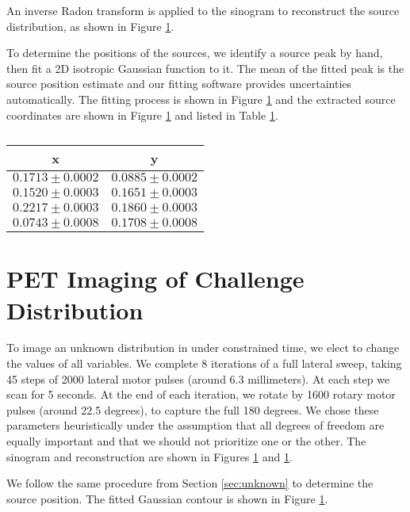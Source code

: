 \documentclass[12pt, letterpaper]{article}
\begin{document}
An inverse Radon transform is applied to the sinogram to reconstruct the source distribution, as shown in Figure \ref{}. 

To determine the positions of the sources, we identify a source peak by hand, then fit a 2D isotropic Gaussian function to it. The mean of the fitted peak is the source position estimate and our fitting software provides uncertainties automatically. The fitting process is shown in Figure \ref{} and the extracted source coordinates are shown in Figure \ref{} and listed in Table \ref{tab:coordinates}. 

\begin{table}
    \centering
    \begin{tabular}{| c | c |}
        \hline
        x & y \\
        \hline
        $0.1713 \pm 0.0002$ & $0.0885 \pm 0.0002$ \\
        $0.1520 \pm 0.0003$ & $0.1651 \pm 0.0003$ \\
        $0.2217 \pm 0.0003$ & $0.1860 \pm 0.0003$ \\
        $0.0743 \pm 0.0008$ & $0.1708 \pm 0.0008$ \\
        \hline
    \end{tabular}
    \caption{}
    \label{tab:coordinates}
\end{table}

\section{PET Imaging of Challenge Distribution}

To image an unknown distribution in under constrained time, we elect to change the values of all variables. We complete 8 iterations of a full lateral sweep, taking 45 steps of 2000 lateral motor pulses (around 6.3 millimeters). At each step we scan for 5 seconds. At the end of each iteration, we rotate by 1600 rotary motor pulses (around 22.5 degrees), to capture the full 180 degrees. We chose these parameters heuristically under the assumption that all degrees of freedom are equally important and that we should not prioritize one or the other. The sinogram and reconstruction are shown in Figures \ref{} and \ref{}. 



We follow the same procedure from Section \ref{sec:unknown} to determine the source position. The fitted Gaussian contour is shown in Figure \ref{}. 
\end{document}
